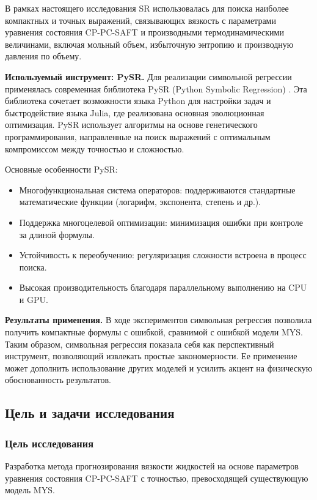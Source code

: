 \documentclass[a4paper,12pt]{article}
\begin{document}
В рамках настоящего исследования SR использовалась для поиска наиболее компактных и точных выражений, связывающих вязкость с параметрами уравнения состояния CP-PC-SAFT и производными термодинамическими величинами, включая мольный объем, избыточную энтропию и производную давления по объему.

\textbf{Используемый инструмент: PySR.}
Для реализации символьной регрессии применялась современная библиотека PySR (Python Symbolic Regression) \cite{cranmer2023pysr}. Эта библиотека сочетает возможности языка Python для настройки задач и быстродействие языка Julia, где реализована основная эволюционная оптимизация. PySR использует алгоритмы на основе генетического программирования, направленные на поиск выражений с оптимальным компромиссом между точностью и сложностью.

Основные особенности PySR:
\begin{itemize}
  \item Многофункциональная система операторов: поддерживаются стандартные математические функции (логарифм, экспонента, степень и др.).
  \item Поддержка многоцелевой оптимизации: минимизация ошибки при контроле за длиной формулы.
  \item Устойчивость к переобучению: регуляризация сложности встроена в процесс поиска.
  \item Высокая производительность благодаря параллельному выполнению на CPU и GPU.
\end{itemize}

\textbf{Результаты применения.}
В ходе экспериментов символьная регрессия позволила получить компактные формулы с ошибкой, сравнимой с ошибкой модели MYS. Таким образом, символьная регрессия показала себя как перспективный инструмент, позволяющий извлекать простые закономерности. Ее применение может дополнить использование других моделей и усилить акцент на физическую обоснованность результатов.

  \subsection{Цель и задачи исследования}

    \subsubsection{Цель исследования}
    
    Разработка метода прогнозирования вязкости жидкостей на основе параметров уравнения состояния CP-PC-SAFT с точностью, превосходящей существующую модель MYS.
    
\end{document}
